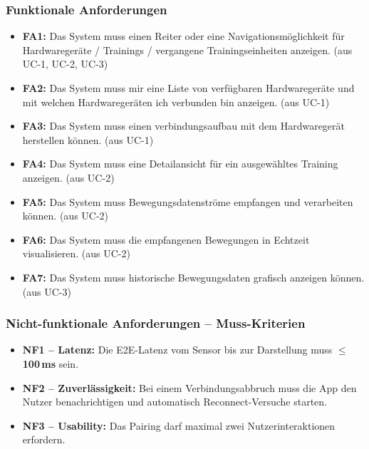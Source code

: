 \documentclass[11pt, a4paper]{article}
\begin{document}
\subsubsection*{Funktionale Anforderungen} \vspace{.25cm}
\begin{itemize}[topsep=0pt, parsep=0pt, itemsep=10pt]
    \item \textbf{FA1:} Das System muss einen Reiter oder eine Navigationsm\"oglichkeit f\"ur Hardwareger\"ate / Trainings / vergangene Trainingseinheiten anzeigen. (aus UC-1, UC-2, UC-3)
    \item \textbf{FA2:} Das System muss mir eine Liste von verfügbaren Hardwareger\"ate und mit welchen Hardwareger\"aten ich verbunden bin anzeigen. (aus UC-1)
    \item \textbf{FA3:} Das System muss einen verbindungsaufbau mit dem Hardwareger\"at herstellen k\"onnen. (aus UC-1)
    \item \textbf{FA4:} Das System muss eine Detailansicht f\"ur ein ausgew\"ahltes Training anzeigen. (aus UC-2)
    \item \textbf{FA5:} Das System muss Bewegungsdatenstr\"ome empfangen und verarbeiten k\"onnen. (aus UC-2)
    \item \textbf{FA6:} Das System muss die empfangenen Bewegungen in Echtzeit visualisieren. (aus UC-2)
    \item \textbf{FA7:} Das System muss historische Bewegungsdaten grafisch anzeigen k\"onnen. (aus UC-3)
\end{itemize}

\vspace{1cm}
\subsubsection*{Nicht-funktionale Anforderungen -- Muss-Kriterien} \vspace{.25cm}
\begin{itemize}[topsep=0pt, parsep=0pt, itemsep=10pt]
    \item \textbf{NF1 -- Latenz:} Die E2E-Latenz vom Sensor bis zur Darstellung muss $\leq$ \textbf{100\,ms} sein.
    \item \textbf{NF2 -- Zuverl\"assigkeit:} Bei einem Verbindungsabbruch muss die App den Nutzer benachrichtigen und automatisch Reconnect-Versuche starten.
    \item \textbf{NF3 -- Usability:} Das Pairing darf maximal zwei Nutzerinteraktionen erfordern.
\end{itemize}
\end{document}
